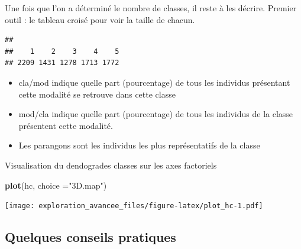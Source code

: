 \documentclass[]{book}
\newenvironment{Shaded}{\begin{snugshade}}{\end{snugshade}}
\newcommand{\DataTypeTok}[1]{\textcolor[rgb]{0.13,0.29,0.53}{#1}}
\newcommand{\KeywordTok}[1]{\textcolor[rgb]{0.13,0.29,0.53}{\textbf{#1}}}
\newcommand{\NormalTok}[1]{#1}
\newcommand{\OperatorTok}[1]{\textcolor[rgb]{0.81,0.36,0.00}{\textbf{#1}}}
\newcommand{\StringTok}[1]{\textcolor[rgb]{0.31,0.60,0.02}{#1}}
\providecommand{\tightlist}{%
  \setlength{\itemsep}{0pt}\setlength{\parskip}{0pt}}
\begin{document}
Une fois que l'on a déterminé le nombre de classes, il reste à les décrire. Premier outil : le tableau croisé pour voir la taille de chacun.

\begin{Shaded}
\end{Shaded}

\begin{verbatim}
## 
##    1    2    3    4    5 
## 2209 1431 1278 1713 1772
\end{verbatim}

\begin{Shaded}
\end{Shaded}

\begin{itemize}
\tightlist
\item
  cla/mod indique quelle part (pourcentage) de tous les individus présentant cette modalité se
  retrouve dans cette classe
\item
  mod/cla indique quelle part (pourcentage) de tous les individus de la classe présentent cette
  modalité.
\item
  Les parangons sont les individus les plus représentatifs de la classe
\end{itemize}

Visualisation du dendogrades classes sur les axes factoriels

\begin{Shaded}
\begin{Highlighting}[]
\KeywordTok{plot}\NormalTok{(hc, }\DataTypeTok{choice =}\StringTok{"3D.map"}\NormalTok{)}
\end{Highlighting}
\end{Shaded}

\texttt{[image: exploration\_avancee\_files/figure-latex/plot\_hc-1.pdf]}

\hypertarget{quelques-conseils-pratiques}{%
\subsection{Quelques conseils pratiques}\label{quelques-conseils-pratiques}}
\end{document}
